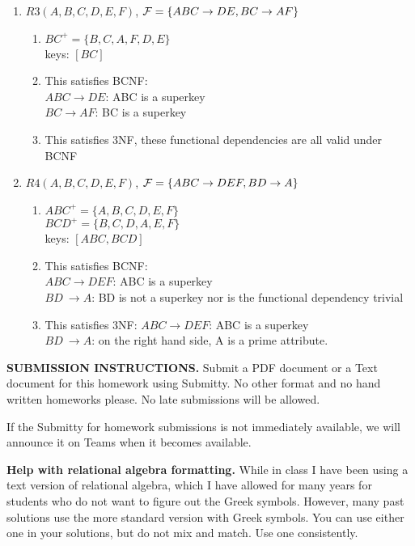 \documentclass[11pt]{article}
\begin{document}
\begin{enumerate}[label=\Alph*]
\item $R3(A,B,C,D,E,F)$, ${\cal F} = \{ABC\rightarrow DE, BC\rightarrow AF \}$
    \begin{enumerate}[label=\Alph*]
    \item $BC^+ = \{B,C,A,F,D,E\}$ \\
    keys: $[BC]$
    \item This satisfies BCNF:\\
    $ABC \rightarrow DE$: ABC is a superkey \\
    $BC \rightarrow AF$: BC is a superkey
    \item This satisfies 3NF, these functional dependencies are all valid under BCNF
    \end{enumerate}
\item $R4(A,B,C,D,E,F)$, ${\cal F} = \{ABC\rightarrow DEF, BD\rightarrow A \}$
    \begin{enumerate}[label=\Alph*]
    \item $ABC^+ = \{A,B,C,D,E,F\}$ \\
    $BCD^+ = \{B,C,D,A,E,F\}$ \\
    keys: $[ABC, BCD]$
    \item This satisfies BCNF:\\
    $ABC \rightarrow DEF$: ABC is a superkey \\
    $BD\ \rightarrow A$: BD is not a superkey nor is the functional dependency trivial
    \item This satisfies 3NF:
    $ABC \rightarrow DEF$: ABC is a superkey \\
    $BD\ \rightarrow A$: on the right hand side, A is a prime attribute.
    \end{enumerate}
\end{enumerate}


{\bf SUBMISSION INSTRUCTIONS.} Submit a PDF document or a Text
document for this homework using Submitty. No other format and no hand
written homeworks please. No late submissions will be allowed.

If the Submitty for homework submissions is not immediately available,
we will announce it on Teams when it becomes available.

{\bf Help with relational algebra formatting.} While in class I have
been using a text version of relational algebra, which I have allowed
for many years for students who do not want to figure out the Greek
symbols. However, many past solutions use the more standard version
with Greek symbols. You can use either one in your solutions, but do
not mix and match. Use one consistently.
\end{document}
